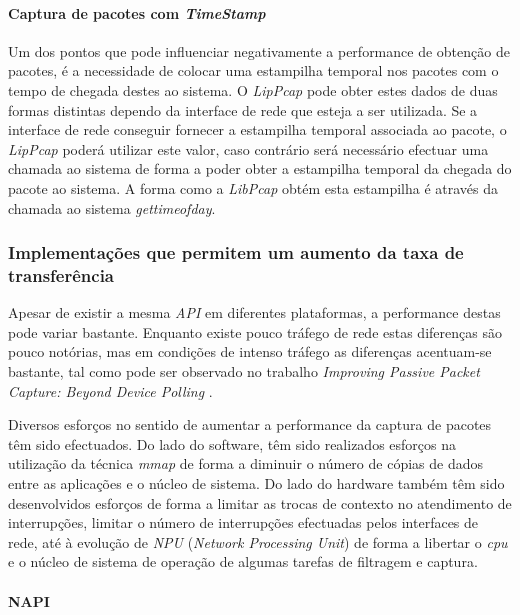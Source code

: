 \paragraph{Captura de pacotes com \textit{TimeStamp}}
Um dos pontos que pode influenciar negativamente a performance de obtenção de pacotes, é a necessidade de colocar uma estampilha temporal nos pacotes com o tempo de chegada destes ao sistema. O \textit{LipPcap} pode obter estes dados de duas formas distintas dependo da interface de rede que esteja a ser utilizada. Se a interface de rede conseguir fornecer a estampilha temporal associada ao pacote, o \textit{LipPcap} poderá utilizar este valor, caso contrário será necessário efectuar uma chamada ao sistema de forma a poder obter a estampilha temporal da chegada do pacote ao sistema. A forma como a \textit{LibPcap} obtém esta estampilha é através da chamada ao sistema \textit{gettimeofday}. 

\subsubsection{Implementações que permitem um aumento da taxa de transferência}

Apesar de existir a mesma \textit{API} em diferentes plataformas, a performance destas pode variar bastante. Enquanto existe pouco tráfego de rede estas diferenças são pouco notórias, mas em condições de intenso tráfego as diferenças acentuam-se bastante, tal como pode ser observado no trabalho \textit{Improving Passive Packet Capture: Beyond Device Polling} \cite{Deri2004}.

Diversos esforços no sentido de aumentar a performance da captura de pacotes têm sido efectuados. Do lado do software, têm sido realizados esforços na utilização da técnica \textit{mmap} de forma a diminuir o número de cópias de dados entre as aplicações e o núcleo de sistema. Do lado do hardware também têm sido desenvolvidos esforços de forma a limitar as trocas de contexto no atendimento de interrupções, limitar o número de interrupções efectuadas pelos interfaces de rede, até à evolução de \textit{NPU} (\textit{Network Processing Unit}) de forma a libertar o \textit{cpu} e o núcleo de sistema de operação de algumas tarefas de filtragem e captura.

\paragraph*{NAPI}

